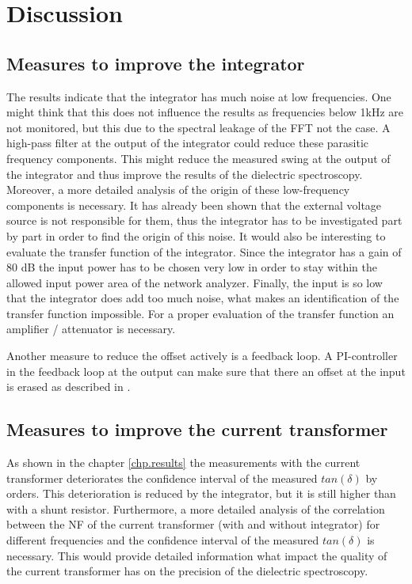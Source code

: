 \chapter{Discussion}

\section{Measures to improve the integrator}
The results indicate that the integrator has much noise at low frequencies. One might think that this does not influence the results as frequencies below 1kHz are not monitored, but this due to the spectral leakage of the FFT not the case.  A high-pass filter at the output of the integrator could reduce these parasitic frequency components. This might reduce the measured swing at the output of the integrator and thus improve the results of the dielectric spectroscopy. 
Moreover, a more detailed analysis of the origin of these low-frequency components is necessary. It has already been shown that the external voltage source is not responsible for them, thus the integrator has to be investigated part by part in order to find the origin of this noise. 
It would also be interesting to evaluate the transfer function of the integrator. Since the integrator has a gain of 80 dB the input power has to be chosen very low in order to stay within the allowed input power area of the network analyzer. Finally, the input is so low that the integrator does add too much noise, what makes an identification of the transfer function impossible. For a proper evaluation of the transfer function an amplifier / attenuator is necessary. 

Another measure to reduce the offset actively is a feedback loop. A PI-controller in the feedback loop at the output can make sure that there an offset at the input is erased as described in \cite{thomas}. 

\section{Measures to improve the current transformer}
As shown in the chapter \ref{chp.results} the measurements with the current transformer deteriorates the confidence interval of the measured $tan(\delta)$ by orders. This deterioration is reduced by the integrator, but it is still higher than with a shunt resistor. 
Furthermore, a more detailed analysis of the correlation between the NF of the current transformer (with and without integrator) for different frequencies and the confidence interval of the measured $tan(\delta)$ is necessary. This would provide detailed information what impact the quality of the current transformer has on the precision of the dielectric spectroscopy. 

